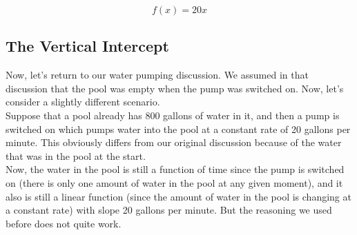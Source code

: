 \begin{equation*}
	f(x)=20x
\end{equation*}



%
%

\subsection{The Vertical Intercept}

Now, let’s return to our water pumping discussion. We assumed in that discussion that the pool was empty when the pump was switched on. Now, let’s consider a slightly different scenario. \\

Suppose that a pool already has 800 gallons of water in it, and then a pump is switched on which pumps water into the pool at a constant rate of 20 gallons per minute. This obviously differs from our original discussion because of the water that was in the pool at the start.\\

Now, the water in the pool is still a function of time since the pump is switched on (there is only one amount of water in the pool at any given moment), and it also is still a linear function (since the amount of water in the pool is changing at a constant rate) with slope 20 gallons per minute. But the reasoning we used before does not quite work.\\

